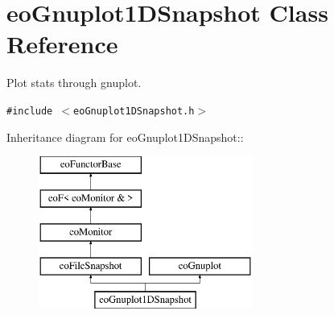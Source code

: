 \section{eo\-Gnuplot1DSnapshot Class Reference}
\label{classeo_gnuplot1_d_snapshot}
Plot stats through gnuplot.  


{\tt \#include $<$eo\-Gnuplot1DSnapshot.h$>$}

Inheritance diagram for eo\-Gnuplot1DSnapshot::\begin{figure}[H]
\begin{center}
\leavevmode
\includegraphics[height=5cm]{classeo_gnuplot1_d_snapshot}
\end{center}
\end{figure}
